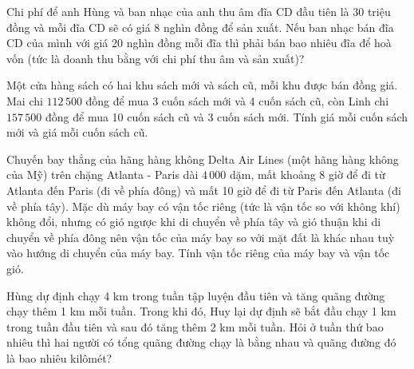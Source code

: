 
\begin{practice}
    \begin{questions}[resume=SBT]
        \item Chi phí để anh Hùng và ban nhạc của anh thu âm đĩa CD đầu tiên là 30 triệu đồng và mỗi đĩa CD sẽ có giá 8 nghìn đồng để sản xuất. Nếu ban nhạc bán đĩa CD của mình với giá 20 nghìn đồng mỗi đĩa thì phải bán bao nhiêu đĩa để hoà vốn (tức là doanh thu bằng với chi phí thu âm và sản xuất)?

        \answerline
        \answerline
        \answerline

        \item Một cửa hàng sách có hai khu sách mới và sách cũ, mỗi khu được bán đồng giá. Mai chi $112\,500$ đồng để mua 3 cuốn sách mới và 4 cuốn sách cũ, còn Linh chi $157\,500$ đồng để mua 10 cuốn sách cũ và 3 cuốn sách mới. Tính giá mỗi cuốn sách mới và giá mỗi cuốn sách cũ.

        \answerline
        \answerline
        \answerline

        \item Chuyến bay thẳng của hãng hàng không Delta Air Lines (một hãng hàng không của Mỹ) trên chặng Atlanta - Paris dài $4\,000$ dặm, mất khoảng 8 giờ để đi từ Atlanta đến Paris (đi về phía đông) và mất 10 giờ để đi từ Paris đến Atlanta (đi về phía tây). Mặc dù máy bay có vận tốc riêng (tức là vận tốc so với không khí) không đổi, nhưng có gió ngược khi di chuyển về phía tây và gió thuận khi di chuyển về phía đông nên vận tốc của máy bay so với mặt đất là khác nhau tuỳ vào hướng di chuyển của máy bay. Tính vận tốc riêng của máy bay và vận tốc gió.

        \answerline
        \answerline
        \answerline
        \answerline

        \item Hùng dự định chạy 4 km trong tuần tập luyện đầu tiên và tăng quãng đường chạy thêm 1 km mỗi tuần. Trong khi đó, Huy lại dự định sẽ bắt đầu chạy 1 km trong tuần đầu tiên và sau đó tăng thêm 2 km mỗi tuần. Hỏi ở tuần thứ bao nhiêu thì hai người có tổng quãng đường chạy là bằng nhau và quãng đường đó là bao nhiêu kilômét?

        \answerline
        \answerline
        \answerline
    \end{questions}
\end{practice}
